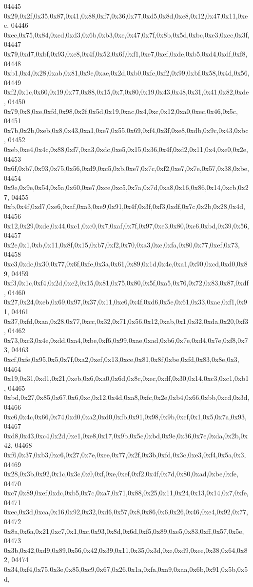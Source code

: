 \begin{DoxyCode}
04445   0x29,0x2f,0x35,0x87,0x41,0x88,0xf7,0x36,0x77,0xd5,0x8d,0xe8,0x12,0x47,0x11,0xee,
04446   0xec,0x75,0x84,0xcd,0xd3,0x6b,0xb3,0xe,0x47,0x7f,0x8b,0x5d,0xbc,0xe3,0xec,0x3f,
04447   0x79,0xd7,0xbf,0x93,0xe8,0x4f,0x52,0x6f,0xf1,0xe7,0xef,0xde,0xb5,0xd4,0xdf,0xf8,
04448   0xb1,0x4,0x28,0xab,0x81,0x9e,0xae,0x2d,0xb0,0xfe,0xf2,0x99,0xbf,0x58,0x4d,0x56,
04449   0xf2,0x1c,0x60,0x19,0x77,0x88,0x15,0x7,0x80,0x19,0x43,0x48,0x31,0x41,0x82,0xde,
04450   0x79,0x8,0xe,0xfd,0x98,0x2f,0x5d,0x19,0xac,0x4,0xc,0x12,0xa0,0xec,0x46,0x5c,
04451   0x7b,0x2b,0xeb,0x8,0x43,0xa1,0xe7,0x55,0x69,0xf4,0x3f,0xe8,0xdb,0x9c,0x43,0xbc,
04452   0xeb,0xe4,0x4c,0x88,0xf7,0xa3,0xdc,0xe5,0x15,0x36,0x4f,0xd2,0x11,0x4,0xe0,0x2e,
04453   0x6f,0xb7,0x93,0x75,0x56,0xd9,0xc5,0xb,0xe7,0x7c,0xf2,0xe7,0x7e,0x57,0x38,0xbe,
04454   0x9e,0x9e,0x54,0x5a,0x60,0xe7,0xce,0xc5,0x7a,0x7d,0xa8,0x16,0x86,0x14,0xcb,0x27,
04455   0xb,0x4f,0xd7,0xe6,0xaf,0xa3,0xe9,0x91,0x4f,0x3f,0xf3,0xdf,0x7c,0x2b,0x28,0x4d,
04456   0x12,0x29,0xde,0x44,0xc1,0xc0,0x7,0xaf,0x7f,0x97,0xe3,0x80,0xc6,0xbd,0x39,0x56,
04457   0x2e,0x1,0xb,0x11,0x8f,0x15,0xb7,0xf2,0x70,0xa3,0xc,0xfa,0x80,0x77,0xef,0x73,
04458   0xc3,0xdc,0x30,0x77,0x6f,0xfe,0x3a,0x61,0x89,0x1d,0x4c,0xa1,0x90,0xcd,0xd0,0x89,
04459   0xf3,0x1c,0xf4,0x2d,0xe2,0x15,0x81,0x75,0x80,0x5f,0xa5,0x76,0x72,0x83,0x87,0xdf,
04460   0x27,0x24,0xeb,0x69,0x97,0x37,0x11,0xc6,0x4f,0xd6,0x5e,0x61,0x33,0xac,0xf1,0x91,
04461   0x37,0xfd,0xaa,0x28,0x77,0xcc,0x32,0x71,0x56,0x12,0xab,0x1,0x32,0xda,0x20,0xf3,
04462   0x73,0xc3,0x4e,0xdd,0xa4,0xbe,0xf6,0x99,0xae,0xad,0xb6,0x7e,0xd4,0x7e,0xf8,0x73,
04463   0xcf,0xfe,0x95,0x5,0x7f,0xa2,0xef,0x13,0xce,0x81,0x8f,0xbe,0xfd,0x83,0x8e,0x3,
04464   0x19,0x31,0xd1,0x21,0xeb,0x6,0xa0,0x6d,0x8c,0xec,0xdf,0x30,0x14,0xc3,0xc1,0xb1,
04465   0xbd,0x27,0x85,0x67,0x6,0xc,0x12,0x4d,0xa8,0xfc,0x2e,0xb4,0x66,0xbb,0xcd,0x3d,
04466   0xc6,0x4c,0x66,0x74,0xd0,0xa2,0xd0,0xfb,0x91,0x98,0x9b,0xcf,0x1,0x5,0x7a,0x93,
04467   0xd8,0x43,0xc4,0x2d,0xe1,0xe8,0x17,0x9b,0x5c,0xbd,0x9e,0x36,0x7e,0xda,0x2b,0x42,
04468   0xf6,0x37,0xb3,0xc6,0x27,0x7e,0xee,0x77,0x2f,0x3b,0xfd,0x3c,0xe3,0xf4,0x5a,0x3,
04469   0x28,0x3b,0x92,0x1c,0x3c,0x0,0xf,0xe,0xef,0xf2,0x4f,0x7d,0x80,0xad,0xbe,0xfe,
04470   0xc7,0x89,0xef,0xdc,0xb5,0x7c,0xa7,0x71,0x88,0x25,0x11,0x24,0x13,0x14,0x7,0xfe,
04471   0xec,0x3d,0xca,0x16,0x92,0x32,0xd6,0x57,0x8,0x86,0x6,0x26,0x46,0xe4,0x92,0x77,
04472   0x8a,0x6a,0x21,0xc7,0x1,0xc,0x93,0x8d,0x6d,0xf5,0x89,0xe5,0x83,0xff,0x57,0x5e,
04473   0x3b,0x42,0xd9,0x89,0x56,0x42,0x39,0x11,0x35,0x3d,0xe,0xd9,0xee,0x38,0x64,0x82,
04474   0x34,0xf4,0x75,0x3e,0x85,0xc9,0x67,0x26,0x1a,0xfa,0xa9,0xaa,0x6b,0x91,0x5b,0x5d,

\end{DoxyCode}
